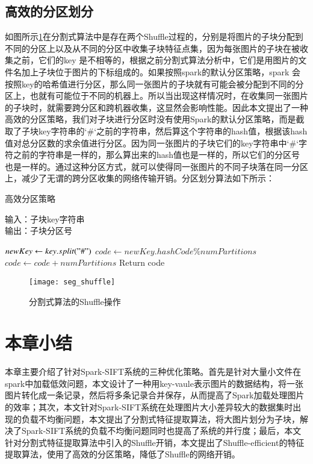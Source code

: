 \subsection{高效的分区划分}
如图所示\ref{fig:seg_shuffle}在分割式算法中是存在两个Shuffle过程的，分别是将图片的子块分配到不同的分区上以及从不同的分区中收集子块特征点集，因为每张图片的子块在被收集之前，它们的key 是不相等的，根据之前分割式算法分析中，它们是用图片的文件名加上子块位于图片的下标组成的。如果按照spark的默认分区策略，spark 会按照key的哈希值进行分区，那么同一张图片的子块就有可能会被分配到不同的分区上，也就有可能位于不同的机器上。所以当出现这样情况时，在收集同一张图片的子块时，就需要跨分区和跨机器收集，这显然会影响性能。因此本文提出了一种高效的分区策略，我们对子块进行分区时没有使用Spark的默认分区策略，而是截取了子块key字符串的`\#`之前的字符串，然后算这个字符串的hash值，根据该hash值对总分区数的求余值进行分区。因为同一张图片的子块它们的key字符串中`\#`字符之前的字符串是一样的，那么算出来的hash值也是一样的，所以它们的分区号也是一样的。通过这种分区方式，就可以使得同一张图片的不同子块落在同一分区上，减少了无谓的跨分区收集的网络传输开销。分区划分算法如下所示：
\begin{algorithm}[htbp]
  \caption{高效分区策略}
  \label{algDiveModel}
  输入：子块key字符串\\
  输出：子块分区号
  \begin{algorithmic}[1]
    \STATE $newKey\leftarrow key.split("\#")$
    \STATE $code\leftarrow newKey.hashCode\%numPartitions$
        \STATE $code\leftarrow code + numPartitions$
    \ENDIF
    \STATE Return code
  \end{algorithmic}
\end{algorithm}

\begin{figure}[htp]
\centering
\texttt{[image: seg\_shuffle]}
\caption{分割式算法的Shuffle操作}
\label{fig:seg_shuffle}
\end{figure}

\section{本章小结}
本章主要介绍了针对Spark-SIFT系统的三种优化策略。首先是针对大量小文件在spark中加载低效问题，本文设计了一种用key-vaule表示图片的数据结构，将一张图片转化成一条记录，然后将多条记录合并保存，从而提高了Spark加载处理图片的效率；其次，本文针对Spark-SIFT系统在处理图片大小差异较大的数据集时出现的负载不均衡问题，本文提出了分割式特征提取算法，将大图片划分为子块，解决了Spark-SIFT系统的负载不均衡问题同时也提高了系统的并行度；最后，本文针对分割式特征提取算法中引入的Shuffle开销，本文提出了Shuffle-efficient的特征提取算法，使用了高效的分区策略，降低了Shuffle的网络开销。
